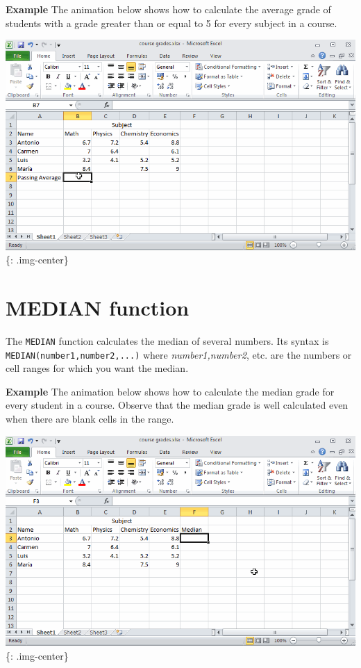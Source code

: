 \textbf{Example} The animation below shows how to calculate the average grade of students with a grade greater than or equal to 5 for every subject in a course. 

\includegraphics[keepaspectratio,width=\textwidth,height=0.75\textheight]{img/example_function_averageif.gif}
\{: .img-center\}

\section{MEDIAN function}
\label{medianfunction}

The \texttt{MEDIAN} function calculates the median of several numbers. Its syntax is \texttt{MEDIAN(number1,number2,...)} where \emph{number1,number2}, etc. are the numbers or cell ranges for which you want the median. 

\textbf{Example} The animation below shows how to calculate the median grade for every student in a course. Observe that the median grade is well calculated even when there are blank cells in the range. 

\includegraphics[keepaspectratio,width=\textwidth,height=0.75\textheight]{img/example_function_median.gif}
\{: .img-center\}

